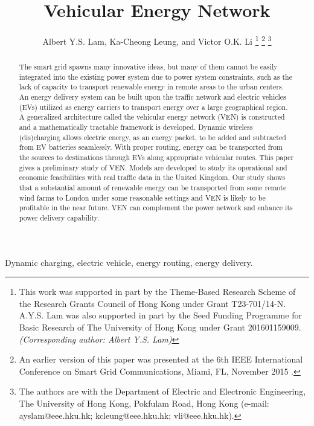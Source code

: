 \documentclass[journal]{IEEEtran}
\begin{document}
\title{Vehicular Energy Network}




\author{Albert Y.S. Lam,
        Ka-Cheong Leung, and 
        Victor O.K. Li
\thanks{This work was supported in part by the Theme-Based Research Scheme of the Research Grants Council of Hong Kong under Grant T23-701/14-N. A.Y.S. Lam was also supported in part by the Seed Funding Programme for Basic Research of The University of Hong Kong under Grant 201601159009. \textit{(Corresponding author: Albert Y.S. Lam)}}		
\thanks{An earlier version of this paper was presented at the 6th IEEE International Conference on Smart Grid Communications, Miami, FL, November 2015 \cite{VEN_conf}.}
\thanks{The authors are with the Department of Electric and Electronic Engineering, The University of Hong Kong, Pokfulam Road, Hong Kong (e-mail: ayslam@eee.hku.hk; kcleung@eee.hku.hk; vli@eee.hku.hk).}
}













\maketitle

\begin{abstract}


The smart grid spawns many innovative ideas, but many of them cannot be easily integrated into the existing power system due to power system constraints, such as the lack of capacity to transport renewable energy in remote areas to the urban centers. An energy delivery system can be built upon the traffic network and electric vehicles (EVs) utilized as energy carriers to transport energy over a large geographical region. A generalized architecture called the vehicular energy network (VEN) is constructed and a mathematically tractable framework is developed. Dynamic wireless (dis)charging allows electric energy, as an energy packet, to be added and subtracted from EV batteries seamlessly. With proper routing, energy can be transported from the sources to destinations through EVs along appropriate vehicular routes. This paper gives a preliminary study of VEN.  Models are developed to study its operational and economic feasibilities with real traffic data in the United Kingdom. Our study shows that a substantial amount of renewable energy can be transported from some remote wind farms to London under some reasonable settings and VEN is likely to be profitable in the near future. VEN can complement the power network and enhance its power delivery capability.


\end{abstract}
\begin{IEEEkeywords}
Dynamic charging, electric vehicle, energy routing, energy delivery.
\end{IEEEkeywords}
\end{document}
